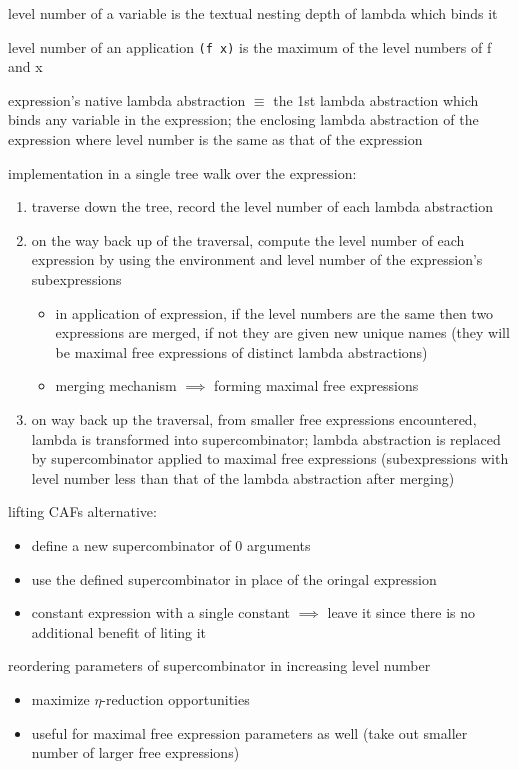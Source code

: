 \documentclass[8pt]{extarticle}
\begin{document}
\begin{multicols*}{2}
\begin{tblr}[]{}
level number of a variable is the textual nesting depth of lambda which binds it

level number of an application \verb|(f x)| is the maximum of the level numbers of f and x

expression's native lambda abstraction $\equiv$ the 1st lambda abstraction which binds any variable in the expression; the enclosing lambda abstraction of the expression where level number is the same as that of the expression

implementation in a single tree walk over the expression:
\begin{enumerate}
\item traverse down the tree, record the level number of each lambda abstraction
\item on the way back up of the traversal, compute the level number of each expression by using the environment and level number of the expression's subexpressions
  \begin{itemize}
  \item in application of expression, if the level numbers are the same then two expressions are merged, if not they are given new unique names (they will be maximal free expressions of distinct lambda abstractions)
  \item merging mechanism $\implies$ forming maximal free expressions
  \end{itemize}
\item on way back up the traversal, from smaller free expressions encountered, lambda is transformed into supercombinator; lambda abstraction is replaced by supercombinator applied to maximal free expressions (subexpressions with level number less than that of the lambda abstraction after merging)
\end{enumerate}

lifting CAFs alternative:
\begin{itemize}
\item define a new supercombinator of 0 arguments
\item use the defined supercombinator in place of the oringal expression
\item constant expression with a single constant $\implies$ leave it since there is no additional benefit of liting it
\end{itemize}

reordering parameters of supercombinator in increasing level number
\begin{itemize}
\item maximize $\eta$-reduction opportunities
\item useful for maximal free expression parameters as well (take out smaller number of larger free expressions)
\end{itemize}


\end{tblr}
\end{multicols*}
\end{document}
